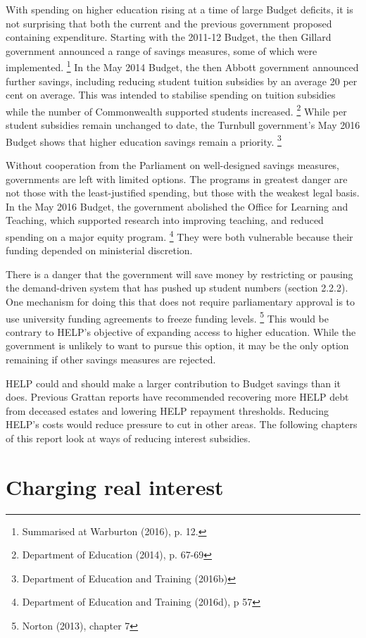 \documentclass[embargoed]{grattan}
\begin{document}
With spending on higher education rising at a time of large Budget deficits, it is not surprising that both the current and the previous government proposed containing expenditure.
Starting with the 2011-12 Budget, the then Gillard government announced a range of savings measures, some of which were implemented.%
\footnote{Summarised at Warburton (2016), p. 12.} In the May 2014 Budget, the then Abbott government announced further savings, including reducing student tuition subsidies by an average 20 per cent on average.
This was intended to stabilise spending on tuition subsidies while the number of Commonwealth supported students increased.%
\footnote{Department of Education (2014), p. 67-69} While per student subsidies remain unchanged to date, the Turnbull government's May 2016 Budget shows that higher education savings remain a priority.%
\footnote{Department of Education and Training (2016b)}

Without cooperation from the Parliament on well-designed savings measures, governments are left with limited options.
The programs in greatest danger are not those with the least-justified spending, but those with the weakest legal basis.
In the May 2016 Budget, the government abolished the Office for Learning and Teaching, which supported research into improving teaching, and reduced spending on a major equity program.%
\footnote{Department of Education and Training (2016d), p 57} They were both vulnerable because their funding depended on ministerial discretion.

There is a danger that the government will save money by restricting or pausing the demand-driven system that has pushed up student numbers (section 2.2.2).
One mechanism for doing this that does not require parliamentary approval is to use university funding agreements to freeze funding levels.%
\footnote{Norton (2013), chapter 7} This would be contrary to \gls{HELP}'s objective of expanding access to higher education.
While the government is unlikely to want to pursue this option, it may be the only option remaining if other savings measures are rejected.

\gls{HELP} could and should make a larger contribution to Budget savings than it does.
Previous Grattan reports have recommended recovering more \gls{HELP} debt from deceased estates and lowering \gls{HELP} repayment thresholds.
Reducing \gls{HELP}'s costs would reduce pressure to cut in other areas.
The following chapters of this report look at ways of reducing interest subsidies.

\chapter{Charging real interest}\label{chap:charging-real-interest}
\end{document}
